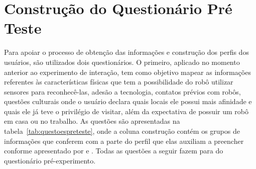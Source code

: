 \section{Construção do Questionário Pré Teste}
\label{sec:questionariopreteste}
Para apoiar o processo de obtenção das informações e construção dos perfis dos usuários, são utilizados dois questionários. O primeiro, aplicado no momento anterior ao experimento de interação, tem como objetivo mapear as informações referentes às características físicas que tem a possibilidade do robô utilizar sensores para reconhecê-las, adesão a tecnologia, contatos prévios com robôs, questões culturais onde o usuário declara quais locais ele possui mais afinidade e quais ele já teve o privilégio de visitar, além da expectativa de possuir um robô em casa ou no trabalho. As questões são apresentadas na tabela~\ref{tab:questoespreteste}, onde a coluna construção contém os grupos de informações que conferem com a parte do perfil que elas auxiliam a preencher conforme apresentado por  e . Todas as questões a seguir fazem para do questionário pré-experimento.

